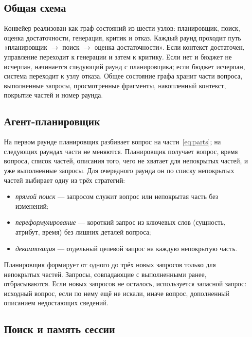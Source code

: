 \documentclass{misisarticle}
\begin{document}
\subsection{Общая схема}

Конвейер реализован как граф состояний из шести узлов: планировщик, поиск, оценка достаточности, генерация, критик и отказ.
Каждый раунд проходит путь «планировщик $\rightarrow$ поиск $\rightarrow$ оценка достаточности».
Если контекст достаточен, управление переходит к генерации и затем к критику.
Если нет и бюджет не исчерпан, начинается следующий раунд с планировщика; если бюджет исчерпан, система переходит к узлу отказа.
Общее состояние графа хранит части вопроса, выполненные запросы, просмотренные фрагменты, накопленный контекст, покрытие частей и номер раунда.

\subsection{Агент-планировщик}

На первом раунде планировщик разбивает вопрос на части~\eqref{eq:parts}; на следующих раундах части не меняются.
Планировщик получает вопрос, время вопроса, список частей, описания того, чего не хватает для непокрытых частей, и уже выполненные запросы.
Для очередного раунда он по списку непокрытых частей выбирает одну из трёх стратегий:
\begin{itemize}[nosep]
  \item \textit{прямой поиск} --- запросом служит вопрос или непокрытая часть без изменений;
  \item \textit{переформулирование} --- короткий запрос из ключевых слов (сущность, атрибут, время) без лишних деталей вопроса;
  \item \textit{декомпозиция} --- отдельный целевой запрос на каждую непокрытую часть.
\end{itemize}
Планировщик формирует от одного до трёх новых запросов только для непокрытых частей.
Запросы, совпадающие с выполненными ранее, отбрасываются.
Если новых запросов не осталось, используется запасной запрос: исходный вопрос, если по нему ещё не искали, иначе вопрос, дополненный описанием недостающих сведений.

\subsection{Поиск и память сессии}
\end{document}
